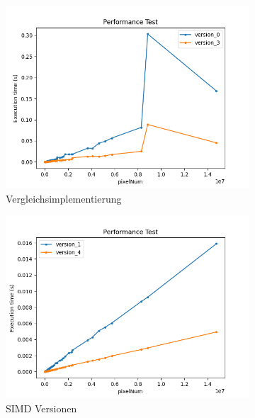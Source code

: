 \documentclass[course=erap]{aspdoc}
\begin{document}
\begin{figure}[H]
    \label{fig:results}
    \begin{subfigure}{.5\columnwidth}
        \centering
        \includegraphics[width=\columnwidth]{graphics/version_0_3.png}
        \caption{Vergleichsimplementierung}
        \label{fig:basic}
    \end{subfigure}
    \begin{subfigure}{.5\columnwidth}
        \centering
        \includegraphics[width=\columnwidth]{graphics/version_1_4.png}
        \caption{SIMD Versionen}
        \label{fig:simd}
    \end{subfigure}
    \begin{subfigure}{.5\columnwidth}

\end{subfigure}
\end{figure}
\end{document}
